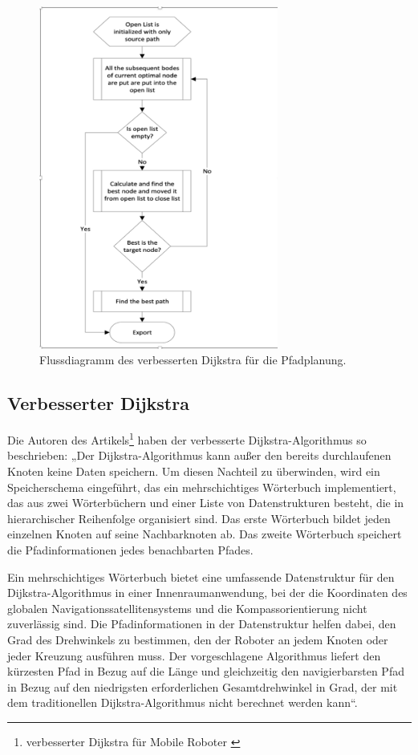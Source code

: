 \begin{figure}[H]
	\centering
	\includegraphics[width=0.7\textwidth]{images/Activity_robot.PNG}
	\caption{\label{fig:Robot}Flussdiagramm des verbesserten Dijkstra für die Pfadplanung\cite{vehicles3030027}.}
\end{figure}

\subsection{Verbesserter Dijkstra }
Die Autoren des Artikels\footnote{ verbesserter Dijkstra für Mobile Roboter \cite{vehicles3030027}} haben der verbesserte Dijkstra-Algorithmus so beschrieben:
„Der Dijkstra-Algorithmus kann außer den bereits durchlaufenen Knoten keine Daten speichern. Um diesen Nachteil zu überwinden, wird ein Speicherschema eingeführt, das ein mehrschichtiges Wörterbuch implementiert, das aus zwei Wörterbüchern und einer Liste von Datenstrukturen besteht, die in hierarchischer Reihenfolge organisiert sind. Das erste Wörterbuch bildet jeden einzelnen Knoten auf seine Nachbarknoten ab. Das zweite Wörterbuch speichert die Pfadinformationen jedes benachbarten Pfades.
\newline
\newline

Ein mehrschichtiges Wörterbuch bietet eine umfassende Datenstruktur für den Dijkstra-Algorithmus in einer Innenraumanwendung, bei der die Koordinaten des globalen Navigationssatellitensystems und die Kompassorientierung nicht zuverlässig sind. Die Pfadinformationen in der Datenstruktur helfen dabei, den Grad des Drehwinkels zu bestimmen, den der Roboter an jedem Knoten oder jeder Kreuzung ausführen muss. Der vorgeschlagene Algorithmus liefert den kürzesten Pfad in Bezug auf die Länge und gleichzeitig den navigierbarsten Pfad in Bezug auf den niedrigsten erforderlichen Gesamtdrehwinkel in Grad, der mit dem traditionellen Dijkstra-Algorithmus nicht berechnet werden kann“.

